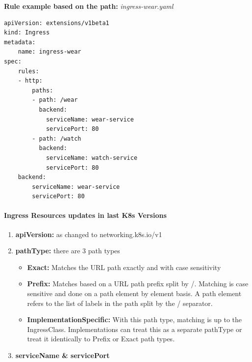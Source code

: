 \documentclass{article}
\newenvironment{codetemplate}[1][]{%
  \mybasecolorbox[#1]
  \itshape
}{%
  \endmybasecolorbox
}
\begin{document}
\textbf{Rule example based on the path:}
\begin{codetemplate}{ingress-wear.yaml}
\begin{verbatim}
apiVersion: extensions/v1beta1
kind: Ingress
metadata:
    name: ingress-wear
spec:
    rules:
    - http:
        paths:
        - path: /wear
          backend:
            serviceName: wear-service
            servicePort: 80
        - path: /watch
          backend:
            serviceName: watch-service
            servicePort: 80 
    backend:
        serviceName: wear-service
        servicePort: 80
\end{verbatim}
\end{codetemplate}

\paragraph{Ingress Resources updates in last K8s Versions}

\begin{enumerate}
    \item \textbf{apiVersion:} as changed to networking.k8s.io/v1
    \item \textbf{pathType:} there are 3 path types
    \begin{itemize}
        \item \textbf{Exact:} Matches the URL path exactly and with case sensitivity
        \item \textbf{Prefix:} Matches based on a URL path prefix split by /. Matching is case sensitive and done on a path element by element basis. A path element refers to the list of labels in the path split by the / separator.
        \item \textbf{ImplementationSpecific:} With this path type, matching is up to the IngressClass. Implementations can treat this as a separate pathType or treat it identically to Prefix or Exact path types.
    \end{itemize}
    \item \textbf{serviceName \& servicePort}
\end{enumerate}
\end{document}
